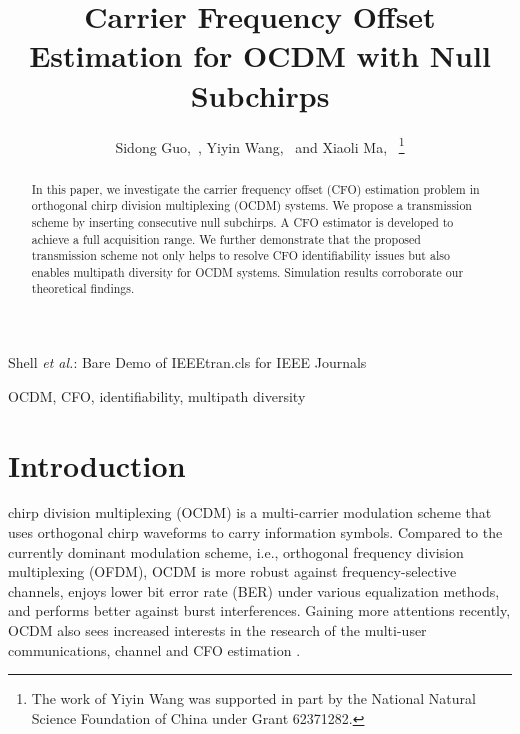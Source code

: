 \documentclass[journal]{IEEEtran}
\begin{document}
\title{Carrier Frequency Offset Estimation for OCDM with Null Subchirps}
\author{Sidong Guo,~, Yiyin Wang,~
      and Xiaoli Ma,~
\thanks{The work of Yiyin Wang was supported in part by the National Natural Science Foundation of China under Grant 62371282.}}

{Shell \MakeLowercase{\textit{et al.}}: Bare Demo of IEEEtran.cls for IEEE Journals}
\maketitle

\begin{abstract}
In this paper, we investigate the carrier frequency offset (CFO) estimation problem in orthogonal chirp division multiplexing (OCDM) systems. We propose a transmission scheme by inserting consecutive null subchirps. A CFO estimator is developed to achieve a full acquisition range. 
We further demonstrate that the proposed transmission scheme not only helps to resolve CFO identifiability issues but also enables multipath diversity for OCDM systems. Simulation results corroborate our theoretical findings. 
\end{abstract}

\begin{IEEEkeywords}
OCDM, CFO, identifiability, multipath diversity
\end{IEEEkeywords}


\IEEEpeerreviewmaketitle



\section{Introduction}

 chirp division multiplexing (OCDM) is a multi-carrier modulation scheme that uses orthogonal chirp waveforms to carry information symbols. Compared to the currently dominant modulation scheme, i.e., orthogonal frequency division multiplexing (OFDM), OCDM \cite{ouyang_orthogonal_2016} \cite{ouyang_chirp_2017} is more robust against frequency-selective channels, enjoys lower bit error rate (BER) under various equalization methods, and performs better against burst interferences. Gaining more attentions recently, OCDM also sees increased interests in the research of the multi-user communications, channel and CFO estimation \cite{Omar_multiuser_2019, ouyang_channel_2018, zhang_channel_2022, filomeno_joint_2022, oliveira_channel_2023}.
\end{document}
